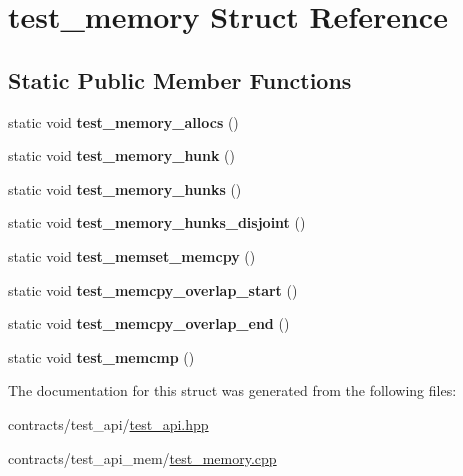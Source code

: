 \hypertarget{structtest__memory}{}\section{test\+\_\+memory Struct Reference}
\label{structtest__memory}
\subsection*{Static Public Member Functions}
\begin{DoxyCompactItemize}
\item 
\mbox{\label{structtest__memory_abfc563b50ed16be8e3356c0736f96fb1}} 
static void {\bfseries test\+\_\+memory\+\_\+allocs} ()
\item 
\mbox{\label{structtest__memory_a569398ace294f607db6f39a20f3eb6ed}} 
static void {\bfseries test\+\_\+memory\+\_\+hunk} ()
\item 
\mbox{\label{structtest__memory_a23b74f07be00aa0e1a7065e8d32ece94}} 
static void {\bfseries test\+\_\+memory\+\_\+hunks} ()
\item 
\mbox{\label{structtest__memory_ae5611b89fc07da71cd5d57ccf4ee1d91}} 
static void {\bfseries test\+\_\+memory\+\_\+hunks\+\_\+disjoint} ()
\item 
\mbox{\label{structtest__memory_a880d5a5b6f0d5e22ab84ea6d97dfd277}} 
static void {\bfseries test\+\_\+memset\+\_\+memcpy} ()
\item 
\mbox{\label{structtest__memory_a1635654de6deb6c0232790dad54eae9b}} 
static void {\bfseries test\+\_\+memcpy\+\_\+overlap\+\_\+start} ()
\item 
\mbox{\label{structtest__memory_a1d2925780a24492d4649dc23844fec1d}} 
static void {\bfseries test\+\_\+memcpy\+\_\+overlap\+\_\+end} ()
\item 
\mbox{\label{structtest__memory_ac866286cd7b533591f18f53c35a2407c}} 
static void {\bfseries test\+\_\+memcmp} ()
\end{DoxyCompactItemize}


The documentation for this struct was generated from the following files\+:\begin{DoxyCompactItemize}
\item 
contracts/test\+\_\+api/\mbox{\hyperlink{test__api_8hpp}{test\+\_\+api.\+hpp}}\item 
contracts/test\+\_\+api\+\_\+mem/\mbox{\hyperlink{test__memory_8cpp}{test\+\_\+memory.\+cpp}}\end{DoxyCompactItemize}
